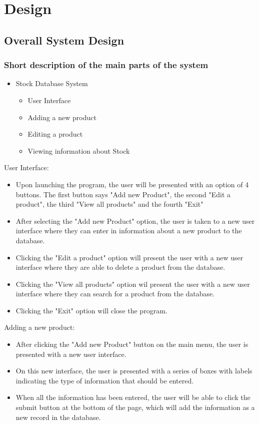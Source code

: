 \chapter{Design}

\section{Overall System Design}

\subsection{Short description of the main parts of the system}
\begin{itemize}
	\item Stock Database System
	\begin{itemize}
		\item User Interface
		\item Adding a new product
		\item Editing a product
		\item Viewing information about Stock
	\end{itemize}
\end{itemize}

User Interface:
\begin{itemize}
	\item Upon launching the program, the user will be presented with an option of 4 buttons. The first button says "Add new Product", the second "Edit a product", the third "View all products" and the fourth "Exit"
	\item After selecting the "Add new Product" option, the user is taken to a new user interface where they can enter in information about a new product to the database.
	\item Clicking the "Edit a product" option will present the user with a new user interface where they are able to delete a product from the database.
	\item Clicking the "View all  products" option wil present the user with a new user interface where they can search for a product from the database.
	\item Clicking the "Exit" option will close the program.
\end{itemize}
Adding a new product:
\begin{itemize}
	\item After clicking the "Add new Product" button on the main menu, the user is presented with a new user interface.
	\item On this new interface, the user is presented with a series of boxes with labels indicating the type of information that should be entered.
	\item When all the information has been entered, the user will be able to click the submit button at the bottom of the page, which will add the information as a new record in the database.
\end{itemize}

